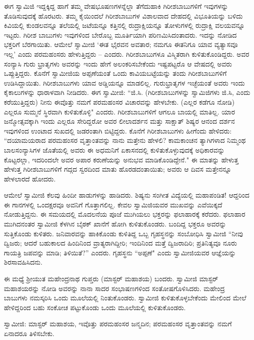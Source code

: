 ಈಗ ಸ್ವಾಮಿಜಿ ಇದ್ದಕ್ಕಿದ್ದ ಹಾಗೆ ತಮ್ಮ ವೇಷಭೂಷಣಗಳನ್ನೆಲ್ಲಾ ತೆಗೆದುಹಾಕಿ ಗಿರೀಶಬಾಬುಗಳಿಗೆ ಇವುಗಳನ್ನು ತೊಡಿಸುವುದಕ್ಕೆ ಹೊರಟರು. ತಮ್ಮ ಕೈಯಿಂದಲೆ ಗಿರೀಶಬಾಬುಗಳ ವಿಶಾಲವಾದ ದೇಹದಲ್ಲಿ ವಿಭೂತಿಯನ್ನು ಬಳಿದು ಕಿವಿಯಲ್ಲಿ ಕುಂಡಲವನ್ನೂ ತಲೆಯಲ್ಲಿ ಜಟೆಯನ್ನೂ ಕತ್ತಿನಲ್ಲಿ ರುದ್ರಾಕ್ಷಿಯನ್ನೂ ತೋಳುಗಳಲ್ಲಿ ರುದ್ರಾಕ್ಷಿ ವಲಯವನ್ನೂ ಇಟ್ಟರು. ಗಿರೀಶ ಬಾಬುಗಳು ಇವುಗಳಿಂದ ಬೇರೊಬ್ಬ ಮೂರ್ತಿಯಾಗಿ ಪರಿಣಮಿಸಿದಂತಾದರು. ಇದನ್ನು ನೋಡಿದ ಭಕ್ತರಿಗೆ ಬೆರಗಾಯಿತು. ಆಮೇಲೆ ಸ್ವಾಮೀಜಿ ‘ಈತ ಭೈರವನ ಅವತಾರ; ನಮಗೂ ಈತನಿಗೂ ಯಾವ ವ್ಯತ್ಯಾಸವೂ ಇಲ್ಲ’ ಎಂದು ಪರಮಹಂಸರು ಹೇಳುತ್ತಿದ್ದರು – ಎಂದರು. ಗಿರೀಶಬಾಬುಗಳೂ ವಿಸ್ಮಿತರಾಗಿ ಕುಳಿತುಕೊಂಡಿದ್ದರು. ಅವರ ಸಂನ್ಯಾಸಿ ಗುರು ಭ್ರಾತೃಗಳು ಅವರನ್ನು ಇಂದು ಹೇಗೆ ಅಲಂಕರಿಸಬೇಕೆಂದು ಇಷ್ಟಪಟ್ಟರೊ ಆ ವೇಷದಲ್ಲಿ ಅವರು ಒಪ್ಪುತ್ತಿದ್ದರು. ಕೊನೆಗೆ ಸ್ವಾಮೀಜಿಯ ಅಪ್ಪಣೆಯಂತೆ ಒಂದು ಕಾವಿಯಬಟ್ಟೆಯನ್ನು ತಂದು ಗಿರೀಶಬಾಬುಗಳಿಗೆ ಉಡಿಸಿದ್ದಾಯಿತು. ಗಿರೀಶಬಾಬುಗಳು ಯಾವ ಅಡ್ಡಿಯನ್ನೂ ಮಾಡಲಿಲ್ಲ. ಗುರುಭ್ರಾತೃಗಳ ಇಚ್ಛೆಯಂತೆ ಅವರು ಇಂದು ಕೈಕಾಲುಗಳನ್ನು ಧಾರಾಳವಾಗಿ ನೀಡಿದರು. ಈಗ ಸ್ವಾಮೀಜಿ: “ಜಿ.ಸಿ. (ಗಿರೀಶಬಾಬುಗಳನ್ನು ಸ್ವಾಮಿಜಿಗಳು ಜಿ.ಸಿ, ಎಂದು ಕರೆಯುತ್ತಿದ್ದರು) ನೀನು ಈವೊತ್ತು ನಮಗೆ ಪರಮಹಂಸರ ವಿಚಾರವನ್ನು ಹೇಳಬೇಕು. (ಎಲ್ಲರ ಕಡೆಗೂ ನೋಡಿ) ಎಲ್ಲರೂ ಸುಮ್ಮನೆ ಸ್ಥಿರವಾಗಿ ಕುಳಿತುಕೊಳ್ಳಿ" ಎಂದರು. ಗಿರೀಶಬಾಬುಗಳಿಗೆ ಆಗಲೂ ಬಾಯಲ್ಲಿ ಮಾತಿಲ್ಲ. ಯಾರ ಜನ್ಮೋತ್ಸವಕ್ಕಾಗಿ ಇಂದು ಎಲ್ಲರೂ ಸೇರಿದ್ದರೋ ಅವರ ಲೀಲಾದರ್ಶನ ಮತ್ತು ಸಾಕ್ಷಾತ್ ಶಿಷ್ಯರ ಆನಂದ ದರ್ಶನ ಇವುಗಳಿಂದ ಉಂಟಾದ ಸುಖದಲ್ಲಿ ಜಡರಂತಾಗಿ ಬಿಟ್ಟಿದ್ದರು. ಕೊನೆಗೆ ಗಿರೀಶಬಾಬುಗಳು ಹೀಗೆಂದು ಹೇಳಿದರು: “ದಯಾಮಯರಾದ ಪರಮಹಂಸರ ವೃತ್ತಾಂತವನ್ನು ನಾನು ಮತ್ತೇನು ಹೇಳಲಿ? ಕಾಮಕಾಂಚನ ತ್ಯಾಗಿಗಳಾದ ನಿಮ್ಮಂಥ ಬಾಲಸಂನ್ಯಾಸಿಗಳ ಜೊತೆಯಲ್ಲಿ ಅವರು ಈ ಅಧಮನಿಗೆ ಏಕಾಸನದಲ್ಲಿ ಕುಳಿತುಕೊಳ್ಳುವುದಕ್ಕೆ ಅಧಿಕಾರವನ್ನು ಕೊಟ್ಟರಲ್ಲಾ, ಇದರಿಂದಲೇ ಅವರ ಅಪಾರ ಕರುಣೆಯನ್ನು ಅನುಭವ ಮಾಡಿಕೊಂಡಿದ್ದೇನೆ." ಈ ಮಾತನ್ನು ಹೇಳುತ್ತ ಹೇಳುತ್ತ ಗಿರೀಶಬಾಬುಗಳಿಗೆ ಗದ್ಗದ ಸ್ವರದಿಂದ ಮಾತು ಹೊರಡದಂತಾಯಿತು; ಅವರು ಆ ದಿವಸ ಮತ್ತೇನನ್ನೂ ಹೇಳಲಾರದೆ ಹೋದರು.

ಆಮೇಲೆ ಸ್ವಾಮೀಜಿ ಕೆಲವು ಹಿಂದೀ ಹಾಡುಗಳನ್ನು ಹಾಡಿದರು. ಶಿಷ್ಯನು ಸಂಗೀತ ವಿದ್ಯೆಯಲ್ಲಿ ಮಹಾಪಂಡಿತ! ಆದ್ದರಿಂದ ಈ ಗಾನಗಳಲ್ಲಿ ಒಂದಕ್ಷರವೂ ಅವನಿಗೆ ಗೊತ್ತಾಗಲಿಲ್ಲ. ಕೇವಲ ಸ್ವಾಮಿಜಿಯವರ ಮುಖವನ್ನು ಎವೆಯಿಕ್ಕದೆ ನೋಡುತ್ತಿದ್ದನು. ಈ ಸಮಯದಲ್ಲಿ ಮೊದಲನೆಯ ಪೂಜೆ ಮುಗಿಯಲು ಭಕ್ತರನ್ನು ಫಲಾಹಾರಕ್ಕೆ ಕರೆದರು. ಫಲಾಹಾರ ಮುಗಿದನಂತರ ಸ್ವಾಮೀಜಿ ಕೆಳಗಿನ ಬೈಠಕ್ ಖಾನೆಗೆ ಹೋಗಿ ಕುಳಿತುಕೊಂಡರು. ಬಂದಿದ್ದ ಭಕ್ತರೂ ಅವರನ್ನು ಸುತ್ತಿಕೊಂಡು ಕುಳಿತರು. ಜನಿವಾರವನ್ನು ಹಾಕಿಕೊಂಡು ಕುಳಿತಿದ್ದ ಒಬ್ಬ ಗೃಹಸ್ಥನನ್ನು ಸಂಬೋಧಿಸಿ ಸ್ವಾಮೀಜಿ “ನೀವು ದ್ವಿಜರು; ಆದರೆ ಬಹುಕಾಲದ ಹಿಂದಿನಿಂದ ವ್ರಾತ್ಯರಾಗಿದ್ದೀರಿ; ಇಂದಿನಿಂದ ಮತ್ತೆ ದ್ವಿಜರಾದಿರಿ; ಪ್ರತಿನಿತ್ಯವೂ ನೂರು ಗಾಯತ್ರಿ ಜಪವನ್ನು ಮಾಡಿ; ತಿಳಿಯಿತೆ?” ಎಂದರು. ಗೃಹಸ್ಥನು “ಅಪ್ಪಣೆ" ಎಂದು ಸ್ವಾಮೀಜಿಯವರ ಆಜ್ಞೆಯನ್ನು ಶಿರಸಾವಹಿಸಿದನು.

ಈ ಮಧ್ಯೆ ಶ‍್ರೀಯುತ ಮಹೇಂದ್ರನಾಥ ಗುಪ್ತರು (ಮಾಸ್ಟರ್ ಮಹಾಶಯ) ಬಂದರು. ಸ್ವಾಮೀಜಿ ಮಾಸ್ಟರ್ ಮಹಾಶಯರನ್ನು ನೋಡಿ ಅವರನ್ನು ನಾನಾ ಸಾದರ ಸಂಭಾಷಣಗಳಿಂದ ಸಂತೋಷಗೊಳಿಸಿದರು. ಮಹೇಂದ್ರ ಬಾಬುಗಳು ನಮಸ್ಕರಿಸಿ ಒಂದು ಮೂಲೆಯಲ್ಲಿ ನಿಂತುಕೊಂಡರು. ಸ್ವಾಮೀಜಿ ಕುಳಿತುಕೊಳ್ಳಬೇಕೆಂದು ಮೇಲಿಂದ ಮೇಲೆ ಹೇಳಿದ್ದರಿಂದ ಬಹು ಸಂಕೋಚ ಪಟ್ಟುಕೊಂಡು ಒಂದು ಮೂಲೆಯಲ್ಲಿ ಕುಳಿತುಕೊಂಡರು.

ಸ್ವಾಮೀಜಿ: ಮಾಸ್ಟರ್ ಮಹಾಶಯ, ಇವೊತ್ತು ಪರಮಹಂಸರ ಜನ್ಮದಿನ; ಪರಮಹಂಸರ ವೃತ್ತಾಂತವನ್ನು ನಮಗೆ ಏನಾದರೂ ತಿಳಿಸಬೇಕು.

